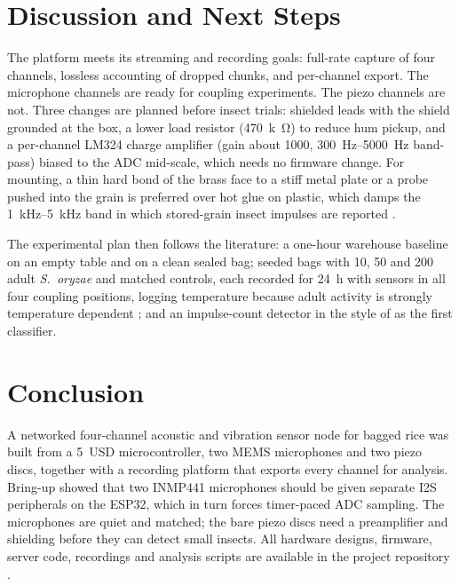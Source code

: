 \documentclass[conference]{IEEEtran}
\begin{document}
\section{Discussion and Next Steps}
The platform meets its streaming and recording goals: full-rate capture of four channels, lossless accounting of dropped chunks, and per-channel export. The microphone channels are ready for coupling experiments. The piezo channels are not. Three changes are planned before insect trials: shielded leads with the shield grounded at the box, a lower load resistor (\SI{470}{k\ohm}) to reduce hum pickup, and a per-channel LM324 charge amplifier (gain about 1000, \SIrange{300}{5000}{Hz} band-pass) biased to the ADC mid-scale, which needs no firmware change. For mounting, a thin hard bond of the brass face to a stiff metal plate or a probe pushed into the grain is preferred over hot glue on plastic, which damps the \SIrange{1}{5}{kHz} band in which stored-grain insect impulses are reported \cite{mankin2011}.

The experimental plan then follows the literature: a one-hour warehouse baseline on an empty table and on a clean sealed bag; seeded bags with 10, 50 and 200 adult \emph{S.~oryzae} and matched controls, each recorded for \SI{24}{h} with sensors in all four coupling positions, logging temperature because adult activity is strongly temperature dependent \cite{hagstrum1993}; and an impulse-count detector in the style of \cite{shuman1993} as the first classifier.

\section{Conclusion}
A networked four-channel acoustic and vibration sensor node for bagged rice was built from a \SI{5}{USD} microcontroller, two MEMS microphones and two piezo discs, together with a recording platform that exports every channel for analysis. Bring-up showed that two INMP441 microphones should be given separate I2S peripherals on the ESP32, which in turn forces timer-paced ADC sampling. The microphones are quiet and matched; the bare piezo discs need a preamplifier and shielding before they can detect small insects. All hardware designs, firmware, server code, recordings and analysis scripts are available in the project repository \cite{repo}.



\end{document}
